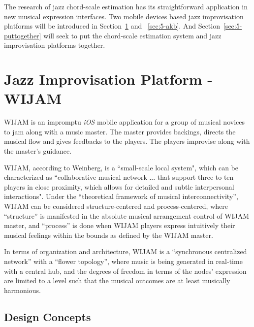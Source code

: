 The research of jazz chord-scale estimation has its straightforward application in new musical expression interfaces. Two mobile devices based jazz improvisation platforms will be introduced in Section~\ref{sec:5-wijam} and ~\ref{sec:5-akb}. And Section~\ref{sec:5-puttogether} will seek to put the chord-scale estimation system and jazz improvisation platforms together.

\section{Jazz Improvisation Platform - WIJAM} \label{sec:5-wijam}
WIJAM is an impromptu \textit{iOS} mobile application for a group of musical novices to jam along with a music master. The master provides backings, directs the musical flow and gives feedbacks to the players. The players improvise along with the master's guidance.

WIJAM, according to Weinberg\cite{weinberg2005interconnected}, is a ``small-scale local system", which can be characterized as ``collaborative musical network ... that support three to ten players in close proximity, which allows for detailed and subtle interpersonal interactions". Under the ``theoretical framework of musical interconnectivity''\cite{weinberg2005interconnected}, WIJAM can be considered structure-centered and process-centered, where ``structure'' is manifested in the absolute musical arrangement control of WIJAM master, and ``process'' is done when WIJAM players express intuitively their musical feelings within the bounds as defined by the WIJAM master.

In terms of organization and architecture, WIJAM is a ``synchronous centralized network''
with a ``flower topology'', where music is being generated in real-time
with a central hub, and the degrees of freedom in terms of the nodes'
expression are limited to a level such that the musical outcomes are at
least musically harmonious.

\subsection{Design Concepts}

